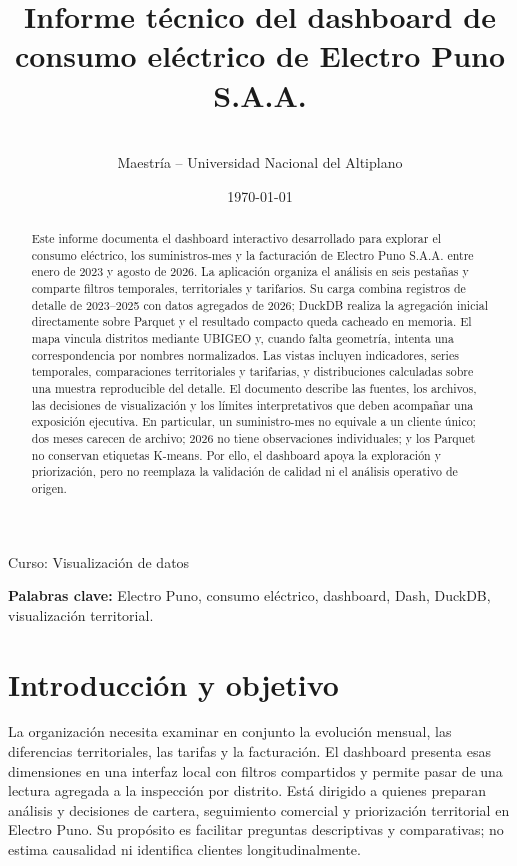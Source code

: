 \documentclass[11pt,a4paper]{article}
\title{Informe técnico del dashboard de consumo eléctrico de Electro Puno S.A.A.}
\author{\integrantes\\Maestría -- Universidad Nacional del Altiplano}
\date{\today}
\begin{document}
\maketitle
\begin{center}\large Curso: Visualización de datos\end{center}
\vspace{1em}
\begin{abstract}
Este informe documenta el dashboard interactivo desarrollado para explorar el consumo eléctrico, los suministros-mes y la facturación de Electro Puno S.A.A. entre enero de 2023 y agosto de 2026. La aplicación organiza el análisis en seis pestañas y comparte filtros temporales, territoriales y tarifarios. Su carga combina registros de detalle de 2023--2025 con datos agregados de 2026; DuckDB realiza la agregación inicial directamente sobre Parquet y el resultado compacto queda cacheado en memoria. El mapa vincula distritos mediante UBIGEO y, cuando falta geometría, intenta una correspondencia por nombres normalizados. Las vistas incluyen indicadores, series temporales, comparaciones territoriales y tarifarias, y distribuciones calculadas sobre una muestra reproducible del detalle. El documento describe las fuentes, los archivos, las decisiones de visualización y los límites interpretativos que deben acompañar una exposición ejecutiva. En particular, un suministro-mes no equivale a un cliente único; dos meses carecen de archivo; 2026 no tiene observaciones individuales; y los Parquet no conservan etiquetas K-means. Por ello, el dashboard apoya la exploración y priorización, pero no reemplaza la validación de calidad ni el análisis operativo de origen.
\end{abstract}
\noindent\textbf{Palabras clave:} Electro Puno, consumo eléctrico, dashboard, Dash, DuckDB, visualización territorial.
\tableofcontents
\listoffigures
\clearpage

\section{Introducción y objetivo}
La organización necesita examinar en conjunto la evolución mensual, las diferencias territoriales, las tarifas y la facturación. El dashboard presenta esas dimensiones en una interfaz local con filtros compartidos y permite pasar de una lectura agregada a la inspección por distrito. Está dirigido a quienes preparan análisis y decisiones de cartera, seguimiento comercial y priorización territorial en Electro Puno. Su propósito es facilitar preguntas descriptivas y comparativas; no estima causalidad ni identifica clientes longitudinalmente.
\end{document}
